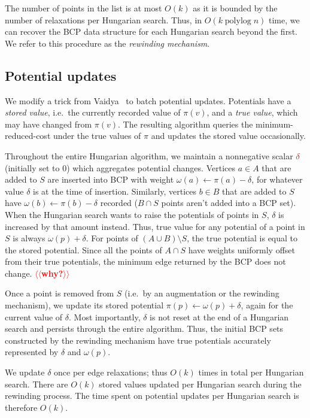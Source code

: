 \documentclass[a4paper,UKenglish]{socg-lipics-v2018}
\makeatletter
\def\note#1{\textcolor{red}{{#1}}}
\def\polylog{\mathop{\mathrm{polylog}}}
\theoremstyle{plain}
\numberwithin{figure}{section}
\def\EMPH#1{\textcolor{BrickRed}{{\emph{#1}}}}
\def\n@te#1{\textsf{\boldmath \textbf{$\langle\!\langle$#1$\rangle\!\rangle$}}\leavevmode}
\def\note#1{\textcolor{red}{\n@te{#1}}}
\makeatother
\begin{document}
The number of points in the list is at most $O(k)$ as it is bounded by the number of relaxations per
Hungarian search.
Thus, in $O(k\polylog n)$ time, we can recover the BCP data structure for each Hungarian search beyond the first.
%
We refer to this procedure as the \EMPH{rewinding mechanism}.


\begin{toappendix}
\subsection{Potential updates}
\label{SSA:potential-update}

We modify a trick from Vaidya~\cite{Vaidya89} to batch potential updates.
Potentials have a \EMPH{stored value}, i.e.\ the currently recorded value of
$\pi(v)$, and a \EMPH{true value}, which may have changed from $\pi(v)$.
The resulting algorithm queries the minimum-reduced-cost under the true values
of $\pi$ and updates the stored value occasionally.

Throughout the entire Hungarian algorithm, we maintain a nonnegative scalar
$\EMPH{$\delta$}$ (initially set to $0$) which aggregates potential changes.
Vertices $a \in A$ that are added to $S$ are inserted into BCP with weight
$\omega(a) \gets \pi(a) - \delta$, for whatever value $\delta$ is at the time
of insertion.
Similarly, vertices $b \in B$ that are added to $S$ have $\omega(b) \gets \pi(b) - \delta$
recorded ($B \cap S$ points aren't added into a BCP set).
When the Hungarian search wants to raise the potentials of points in $S$,
$\delta$ is increased by that amount instead.
Thus, true value for any potential of a point in $S$ is always $\omega(p) + \delta$.
For points of $(A \cup B) \setminus S$, the true potential is equal to the
stored potential.
Since all the points of $A \cap S$ have weights uniformly offset from their
true potentials, the minimum edge returned by the BCP does not change. \note{why?}

Once a point is removed from $S$ (i.e.\ by an augmentation or the rewinding
mechanism), we update its stored potential $\pi(p) \gets \omega(p) + \delta$,
again for the current value of $\delta$.
Most importantly, $\delta$ is not reset at the end of a Hungarian search and
persists through the entire algorithm.
Thus, the initial BCP sets constructed by the rewinding mechanism have true
potentials accurately represented by $\delta$ and $\omega(p)$.

We update $\delta$ once per edge relaxations; thus $O(k)$ times in total per Hungarian search.
There are $O(k)$ stored values updated per Hungarian search during the rewinding process.
The time spent on potential updates per Hungarian search is therefore $O(k)$.
\end{toappendix}
\end{document}
